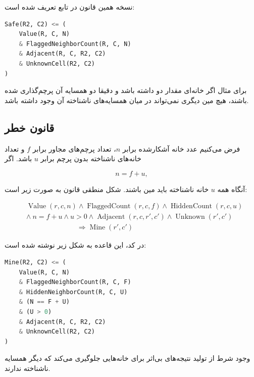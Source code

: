 \documentclass[10.5pt]{exam}
\begin{document}
نسخه
همین قانون در تابع
تعریف شده است:

\begin{latin}
    \begin{lstlisting}[language=Python]
Safe(R2, C2) <= (
    Value(R, C, N)
    & FlaggedNeighborCount(R, C, N)
    & Adjacent(R, C, R2, C2)
    & UnknownCell(R2, C2)
)
\end{lstlisting}
\end{latin}

برای مثال اگر خانه‌ای مقدار دو داشته باشد و دقیقا دو همسایه آن پرچم‌گذاری شده باشند، هیچ مین دیگری نمی‌تواند در میان همسایه‌های ناشناخته آن وجود داشته باشد.

\subsection{قانون خطر}
فرض می‌کنیم عدد خانه آشکارشده برابر $n$، تعداد پرچم‌های مجاور برابر $f$ و تعداد خانه‌های ناشناخته بدون پرچم برابر $u$ باشد. اگر

\[
    n=f+u,
\]

آنگاه همه $u$ خانه ناشناخته باید مین باشند. شکل منطقی قانون به صورت زیر است:

\[
    \begin{aligned}
         & \operatorname{Value}(r,c,n) \land
        \operatorname{FlaggedCount}(r,c,f) \land
        \operatorname{HiddenCount}(r,c,u)                         \\
         & \land\ n=f+u \land u>0
        \land \operatorname{Adjacent}(r,c,r',c')
        \land \operatorname{Unknown}(r',c')                       \\
         & \hspace{3cm}\Longrightarrow \operatorname{Mine}(r',c')
    \end{aligned}
\]

در کد، این قاعده به شکل زیر نوشته شده است:

\begin{latin}
    \begin{lstlisting}[language=Python]
Mine(R2, C2) <= (
    Value(R, C, N)
    & FlaggedNeighborCount(R, C, F)
    & HiddenNeighborCount(R, C, U)
    & (N == F + U)
    & (U > 0)
    & Adjacent(R, C, R2, C2)
    & UnknownCell(R2, C2)
)
\end{lstlisting}
\end{latin}

وجود شرط
از تولید نتیجه‌های بی‌اثر برای خانه‌هایی جلوگیری می‌کند که دیگر همسایه ناشناخته ندارند.
\end{document}
